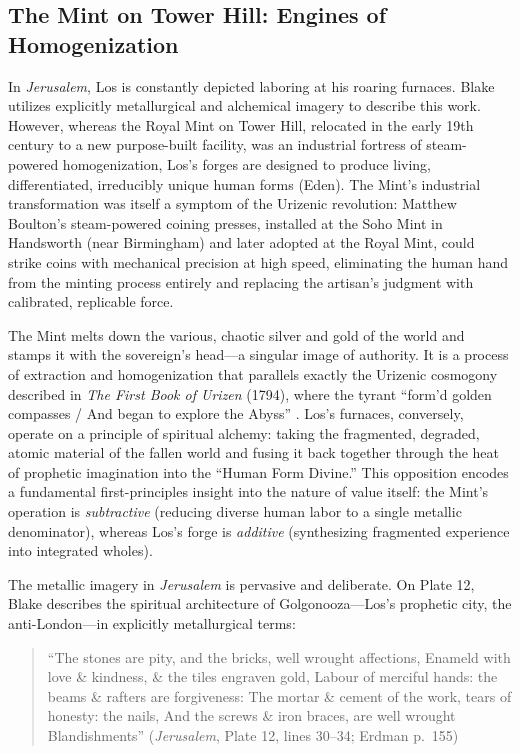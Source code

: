 \documentclass[
]{article}
\begin{document}
\subsection{The Mint on Tower Hill: Engines of
Homogenization}\label{the-mint-on-tower-hill-engines-of-homogenization}

In \emph{Jerusalem}, Los is constantly depicted laboring at his roaring
furnaces. Blake utilizes explicitly metallurgical and alchemical imagery
to describe this work. However, whereas the Royal Mint on Tower Hill,
relocated in the early 19th century to a new purpose-built facility, was
an industrial fortress of steam-powered homogenization, Los's forges are
designed to produce living, differentiated, irreducibly unique human
forms (Eden). The Mint's industrial transformation was itself a symptom
of the Urizenic revolution: Matthew Boulton's steam-powered coining
presses, installed at the Soho Mint in Handsworth (near Birmingham) and
later adopted at the Royal Mint, could strike coins with mechanical
precision at high speed, eliminating the human hand from the minting
process entirely and replacing the artisan's judgment with calibrated,
replicable force.

The Mint melts down the various, chaotic silver and gold of the world
and stamps it with the sovereign's head---a singular image of authority.
It is a process of extraction and homogenization that parallels exactly
the Urizenic cosmogony described in \emph{The First Book of Urizen}
(1794), where the tyrant ``form'd golden compasses / And began to
explore the Abyss'' \citep{blake1794urizen}. Los's furnaces, conversely,
operate on a principle of spiritual alchemy: taking the fragmented,
degraded, atomic material of the fallen world and fusing it back
together through the heat of prophetic imagination into the ``Human Form
Divine.'' This opposition encodes a fundamental first-principles insight
into the nature of value itself: the Mint's operation is
\emph{subtractive} (reducing diverse human labor to a single metallic
denominator), whereas Los's forge is \emph{additive} (synthesizing
fragmented experience into integrated wholes).

The metallic imagery in \emph{Jerusalem} is pervasive and deliberate. On
Plate 12, Blake describes the spiritual architecture of
Golgonooza---Los's prophetic city, the anti-London---in explicitly
metallurgical terms:

\begin{quote}
``The stones are pity, and the bricks, well wrought affections, Enameld
with love \& kindness, \& the tiles engraven gold, Labour of merciful
hands: the beams \& rafters are forgiveness: The mortar \& cement of the
work, tears of honesty: the nails, And the screws \& iron braces, are
well wrought Blandishments'' (\emph{Jerusalem}, Plate 12, lines 30--34;
Erdman p.~155) \citep{erdman1988complete}
\end{quote}
\end{document}
